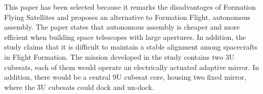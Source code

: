 This paper has been selected because it remarks the disadvantages
of Formation Flying Satellites and proposes an alternative to Formation
Flight, autonomous assembly. The paper states that autonomous assembly
is cheaper and more efficient when building space telescopes with
large apertures. In addition, the study claims that it is difficult
to maintain a stable alignment among spacecrafts in Flight Formation.
The mission developed in the study contains two 3U cubesats, each
of them would operate an electrically actuated adaptive mirror. In
addition, there would be a central 9U cubesat core, housing two fixed
mirror, where the 3U cubesats could dock and un-dock.\cite{Underwood_ReconfigTelescope}